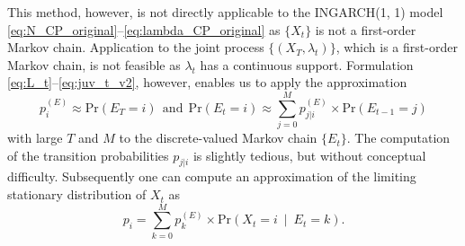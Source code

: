 \documentclass{article}
\begin{document}
This method, however, is not directly applicable to the INGARCH(1, 1) model \eqref{eq:N_CP_original}--\eqref{eq:lambda_CP_original} as $\{X_t\}$ is not a first-order Markov chain. Application to the joint process $\{(X_T, \lambda_t)\}$, which is a first-order Markov chain, is not feasible as $\lambda_t$ has a continuous support. Formulation \eqref{eq:L_t}--\eqref{eq:juv_t_v2}, however, enables us to apply the approximation
$$
p^{(E)}_i \approx \text{Pr}(E_T = i) \ \ \text{and} \ \ \text{Pr}(E_t = i) \approx \sum_{j = 0}^M p^{(E)}_{j|i} \times \text{Pr}(E_{t - 1} = j)
$$
with large $T$ and $M$ to the discrete-valued Markov chain $\{E_t\}$. The computation of the transition probabilities $p_{j|i}$ is slightly tedious, but without conceptual difficulty. Subsequently one can compute an approximation of the limiting stationary distribution of $X_t$ as
$$
p_i = \sum_{k = 0}^M p_k^{(E)} \times \text{Pr}(X_t = i \ \mid \ E_t = k).
$$





\end{document}
